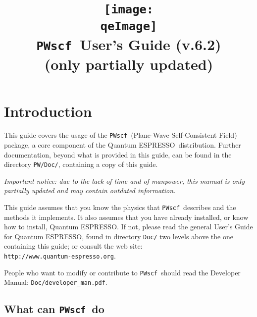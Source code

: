 \documentclass[12pt,a4paper]{article}
\def\version{6.2}
\def\PWscf{\texttt{PWscf}}
\def\qe{{\sc Quantum ESPRESSO}}
\begin{document}
 
\author{}
\date{}

\def\qeImage{../../Doc/quantum_espresso.pdf}

\title{
  \texttt{[image: \\qeImage]} \\
  \Huge \PWscf\ User's Guide (v.\version) 
  \\ \Large (only partially updated)
}

\maketitle

\tableofcontents

\section{Introduction}

This guide covers the usage of the \PWscf\ 
(Plane-Wave Self-Consistent Field) package,
a core component of the \qe\ distribution.
Further documentation, beyond what is provided 
in this guide, can be found in the directory
\texttt{PW/Doc/}, containing a copy of this guide.

{\em Important notice: due to the lack of time and of manpower, this
manual is only partially updated and may contain outdated information.}

This guide assumes that you know the physics 
that \PWscf\ describes and the methods it implements.
It also assumes  that you have already installed,
or know how to install, \qe. If not, please read
the general User's Guide for \qe, found in 
directory \texttt{Doc/} two levels above the 
one containing this guide; or consult the web site:\\
\texttt{http://www.quantum-espresso.org}.

People who want to modify or contribute to 
\PWscf\ should read the Developer Manual: 
\texttt{Doc/developer\_man.pdf}.

\subsection{What can \PWscf\ do}
\end{document}
